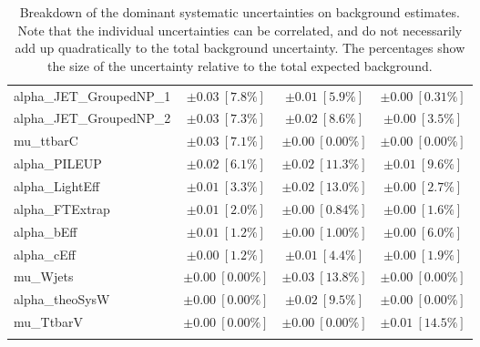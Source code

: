 \begin{sidewaystable}
\begin{center}
\begin{tabular*}{\textwidth}{@{\extracolsep{\fill}}lccc}
alpha\_JET\_GroupedNP\_1         & $\pm 0.03\ [7.8\%] $          & $\pm 0.01\ [5.9\%] $          & $\pm 0.00\ [0.31\%] $       \\
alpha\_JET\_GroupedNP\_2         & $\pm 0.03\ [7.3\%] $          & $\pm 0.02\ [8.6\%] $          & $\pm 0.00\ [3.5\%] $       \\
mu\_ttbarC         & $\pm 0.03\ [7.1\%] $          & $\pm 0.00\ [0.00\%] $          & $\pm 0.00\ [0.00\%] $       \\
alpha\_PILEUP         & $\pm 0.02\ [6.1\%] $          & $\pm 0.02\ [11.3\%] $          & $\pm 0.01\ [9.6\%] $       \\
alpha\_LightEff         & $\pm 0.01\ [3.3\%] $          & $\pm 0.02\ [13.0\%] $          & $\pm 0.00\ [2.7\%] $       \\
alpha\_FTExtrap         & $\pm 0.01\ [2.0\%] $          & $\pm 0.00\ [0.84\%] $          & $\pm 0.00\ [1.6\%] $       \\
alpha\_bEff         & $\pm 0.01\ [1.2\%] $          & $\pm 0.00\ [1.00\%] $          & $\pm 0.00\ [6.0\%] $       \\
alpha\_cEff         & $\pm 0.00\ [1.2\%] $          & $\pm 0.01\ [4.4\%] $          & $\pm 0.00\ [1.9\%] $       \\
mu\_Wjets         & $\pm 0.00\ [0.00\%] $          & $\pm 0.03\ [13.8\%] $          & $\pm 0.00\ [0.00\%] $       \\
alpha\_theoSysW         & $\pm 0.00\ [0.00\%] $          & $\pm 0.02\ [9.5\%] $          & $\pm 0.00\ [0.00\%] $       \\
mu\_TtbarV         & $\pm 0.00\ [0.00\%] $          & $\pm 0.00\ [0.00\%] $          & $\pm 0.01\ [14.5\%] $       \\
\noalign{\smallskip}\hline\noalign{\smallskip}
\end{tabular*}
\end{center}
\caption[Breakdown of uncertainty on background estimates]{
Breakdown of the dominant systematic uncertainties on background estimates.
Note that the individual uncertainties can be correlated, and do not necessarily add up quadratically to 
the total background uncertainty. The percentages show the size of the uncertainty relative to the total expected background.
\label{table.results.bkgestimate.uncertainties.SRC5_bybkg}}
\end{sidewaystable}
%
